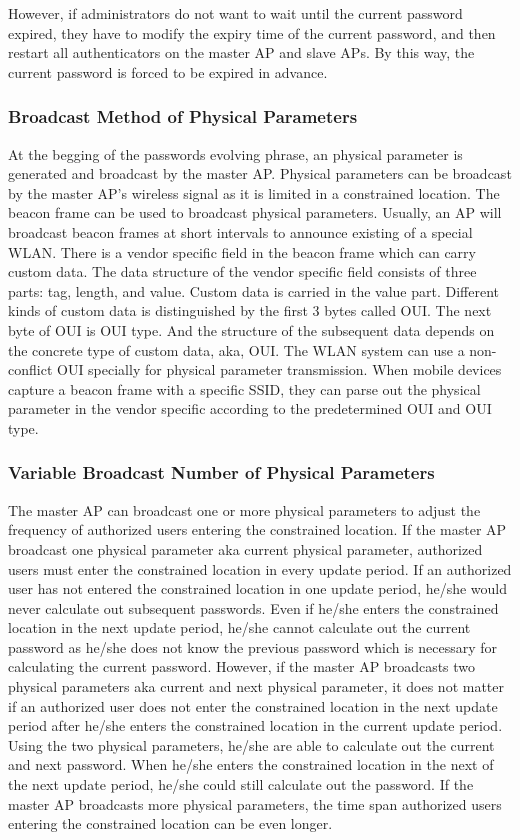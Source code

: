 However, if administrators do not want to wait until the current password expired, they have to modify the expiry time of the current password, and then restart all authenticators on the master AP and slave APs. By this way, the current password is forced to be expired in advance. 

\subsubsection{Broadcast Method of Physical Parameters}
At the begging of the passwords evolving phrase, an physical parameter is generated and broadcast by the master AP. Physical parameters can be broadcast by the master AP’s wireless signal as it is limited in a constrained location. The beacon frame can be used to broadcast physical parameters. Usually, an AP will broadcast beacon frames at short intervals to announce existing of a special WLAN. There is a vendor specific field in the beacon frame which can carry custom data. The data structure of the vendor specific field consists of three parts: tag, length, and value. Custom data is carried in the value part. Different kinds of custom data is distinguished by the first 3 bytes called OUI. The next byte of OUI is OUI type. And the structure of the subsequent data depends on the concrete type of custom data, aka, OUI. The WLAN system can use a non-conflict OUI specially for physical parameter transmission. When mobile devices capture a beacon frame with a specific SSID, they can parse out the physical parameter in the vendor specific according to the predetermined OUI and OUI type. 

\subsubsection{Variable Broadcast Number of Physical Parameters}
The master AP can broadcast one or more physical parameters to adjust the frequency of authorized users entering the constrained location. If the master AP broadcast one physical parameter aka current physical parameter, authorized users must enter the constrained location in every update period. If an authorized user has not entered the constrained location in one update period, he/she would never calculate out subsequent passwords. Even if he/she enters the constrained location in the next update period, he/she cannot calculate out the current password as he/she does not know the previous password which is necessary for calculating the current password. However, if the master AP broadcasts two physical parameters aka current and next physical parameter, it does not matter if an authorized user does not enter the constrained location in the next update period after he/she enters the constrained location in the current update period. Using the two physical parameters, he/she are able to calculate out the current and next password. When he/she enters the constrained location in the next of the next update period, he/she could still calculate out the password. If the master AP broadcasts more physical parameters, the time span authorized users entering the constrained location can be even longer. 

